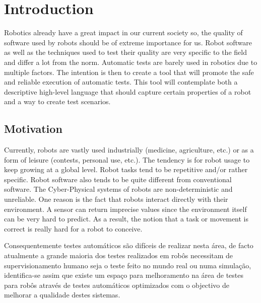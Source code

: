 \chapter{Introduction}
\label{chap:introduction}

Robotics already have a great impact in our current society so, 
the quality of software used by robots should be of extreme importance for us.
Robot software as well as the techniques used to test their quality are 
very specific to the field and differ a lot from the norm.
Automatic tests are barely used in robotics due to multiple factors.
The intention is then to create a tool that will promote the safe 
and reliable execution of automatic tests.
This tool will contemplate both a descriptive high-level language 
that should capture certain properties of a robot and a way to create test scenarios.

\section{Motivation}
\label{sec:motivation}

Currently, robots are vastly used industrially (medicine, agriculture, etc.) 
or as a form of leisure (contests, personal use, etc.).
The tendency is for robot usage to keep growing at a global level.
Robot tasks tend to be repetitive and/or rather specific.
Robot software also tends to be quite different from conventional software.
The Cyber-Physical systems of robots are non-deterministic and unreliable.
One reason is the fact that robots interact directly with their environment.
A sensor can return imprecise values since the environment itself can be very hard to predict.
As a result, the notion that a task or movement is correct is really hard for a robot to conceive.

\par


Consequentemente testes 
automáticos são difíceis de realizar nesta área, de facto atualmente a grande maioria dos testes 
realizados em robôs necessitam de supervisionamento humano seja o teste feito no mundo real ou numa 
simulação, identifica-se assim que existe um espaço para melhoramento na área de testes para robôs 
através de testes automáticos optimizados com o objectivo de melhorar a qualidade destes sistemas.

